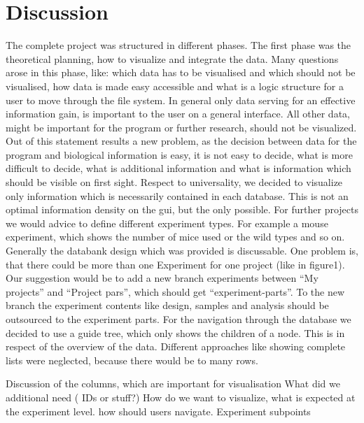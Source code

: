 \documentclass[a4paper, 11pt]{article}
\begin{document}
\section{Discussion}
The complete project was structured in different phases. The first phase was the theoretical planning, how to visualize and integrate the data. Many questions arose in this phase, like: which data has to be visualised and which should not be visualised, how data is made easy accessible and what is a logic structure for a user to move through the file system.
In general only data serving for an effective information gain, is important to the user on a general interface. All other data, might be important for the program or further research, should not be visualized. Out of this statement results a new problem, as the decision between data for the program and biological information is easy, it is not easy to decide, what is more difficult to decide, what is additional information and what is information which should be visible on first sight. Respect to universality, we decided to visualize only information which is necessarily contained in each database. This is not an optimal information density on the gui, but the only possible. For further projects we would advice to define different experiment types. For example a mouse experiment, which shows the number of mice used or the wild types and so on.
Generally the databank design which was provided is discussable. One problem is, that there could be more than one Experiment for one project (like in figure1).   Our suggestion would be to add a new branch experiments between “My projects” and “Project pars”, which should get “experiment-parts”. To the new branch the experiment contents like design, samples and analysis should be outsourced to the experiment parts.
For the navigation through the database we decided to use a guide tree, which only shows the children of a node. This is in respect of the overview of the data. Different approaches like showing complete lists were neglected, because there would be to many rows.



Discussion of the columns, which are important for visualisation
What did we additional need ( IDs or stuff?)
How do we want to visualize, what is expected at the experiment level. how should users navigate.
Experiment subpoints

\clearpage

\end{document}
